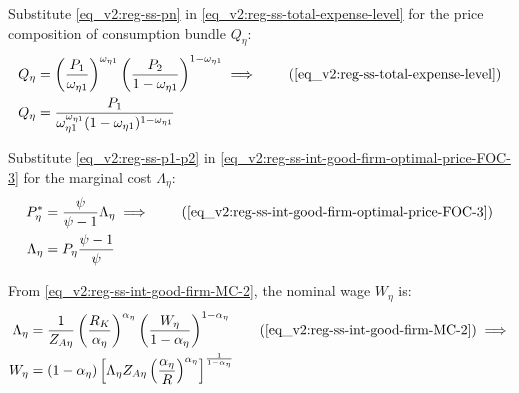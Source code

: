 \documentclass[../thesis.tex]{subfiles}
\begin{document}
Substitute \ref{eq_v2:reg-ss-pn} in \ref{eq_v2:reg-ss-total-expense-level} for the price composition of consumption bundle $Q_{\eta}$:
\begin{align}
	Q_{\eta} &= \left( \frac{P_{1}}{\omega_{\eta 1}} \right)^{\omega_{\eta 1}} \left( \frac{P_{2}}{1 -\omega_{\eta 1}} \right)^{1 -\omega_{\eta 1}} \implies \tag{\ref{eq_v2:reg-ss-total-expense-level}} \\
	Q_{\eta} &= \frac{ P_{1} }{\omega_{\eta 1}^{\omega_{\eta 1}} (1 - \omega_{\eta 1})^{1 - \omega_{\eta 1}}} \label{eq_v2:reg-ss-q1}
\end{align}

\begin{comment}
	Substitute \ref{eq_v2:reg-ss-q1} in \ref{eq_v2:reg-ss-total-expense-level-2}:
	\begin{align}
		Q_{2} &= Q_{1} \frac{\omega_{11}^{\omega_{11}} (1 - \omega_{11})^{1 - \omega_{11}}}{\omega_{21}^{\omega_{21}} (1 -\omega_{21})^{1 -\omega_{21}}} \tag{\ref{eq_v2:reg-ss-total-expense-level-2}} \implies \\
		Q_{2} &= \frac{P_{1} \theta_{P}^{1 - \omega_{11}}}{\omega_{21}^{\omega_{21}} (1 - \omega_{21})^{1 - \omega_{21}}} \label{eq_v2:reg-ss-q2}
	\end{align}
\end{comment}

Substitute \ref{eq_v2:reg-ss-p1-p2} in \ref{eq_v2:reg-ss-int-good-firm-optimal-price-FOC-3} for the marginal cost $\Lambda_{\eta}$:
\begin{align}
	P_{\eta}^{\ast} &= \frac{\psi}{\psi-1} \Lambda_{\eta} \implies \tag{\ref{eq_v2:reg-ss-int-good-firm-optimal-price-FOC-3}} \\
	\Lambda_{\eta} &= P_{\eta} \frac{\psi-1}{\psi} \label{eq_v2:reg-ss-marginal-cost}
\end{align}

From \ref{eq_v2:reg-ss-int-good-firm-MC-2}, the nominal wage $W_{\eta}$ is:
\begin{alignat}{2}
	\Lambda_{\eta} &= \frac{1}{Z_{A\eta}} \left( \frac{R_{K}}{{\alpha_{\eta}}} \right)^{{\alpha_{\eta}}} \left( \frac{W_{\eta}}{1-\alpha_{\eta}} \right)^{1-\alpha_{\eta}} \tag{\ref{eq_v2:reg-ss-int-good-firm-MC-2}} \implies \\
	W_{\eta} &= \left( 1 - \alpha_{\eta} \right) \left[ \Lambda_{\eta} Z_{A\eta} \left( \frac{\alpha_{\eta}}{R} \right)^{\alpha_{\eta}} \right]^{\frac{1}{1 - \alpha_{\eta}}} \label{eq_v2:reg-ss-nominal-wage}
\end{alignat}
\end{document}
